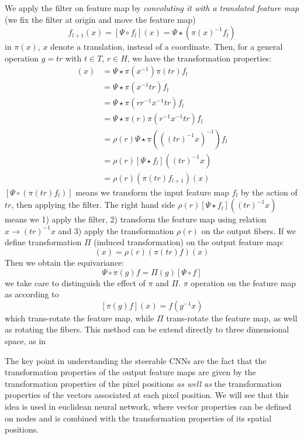 \documentclass{IEEEtran}
\begin{document}
We apply the filter on feature map by \emph{convoluting it with a translated 
feature map} (we fix the filter at origin and move the feature map)
\begin{equation}
    f_{l+1}(x) = [\Psi \circ f_l](x) = \Psi \star ( \pi(x)^{-1} f_l )
\end{equation}
in $\pi(x)$, $x$ denote a translation, instead of a coordinate. 
Then, for a general operation $g = tr$ with $t\in T$, $r \in H$, we have the transformation 
properties:
\begin{align*}
    [\Psi \circ (\pi(tr)f_l)](x) 
        &= \Psi \star \pi(x^{-1})\pi(tr) f_l \\
        &= \Psi \star \pi(x^{-1}tr) f_l \\
        &= \Psi \star \pi(rr^{-1}x^{-1}tr) f_l \\
        &= \Psi \star \pi(r) \pi(r^{-1}x^{-1}tr) f_l \\
        &= \rho(r) \Psi \star \pi\left(\left((tr)^{-1}x\right)^{-1}\right) f_l \\
        &= \rho(r) [ \Psi \star  f_l ]  ((tr)^{-1}x)\\
        &= \rho(r) (\pi(tr) f_{l+1}) (x) 
\end{align*}
$[\Psi \circ (\pi(tr)f_l)]$ means we transform the input feature map $f_l$ by the action of $tr$, then applying the filter. 
The right hand side $\rho(r) [ \Psi \star  f_l ]  ((tr)^{-1}x)$ means we 
1) apply the filter, 
2) transform the feature map using relation $x\to(tr)^{-1}x$ and 
3) apply the transformation $\rho(r)$ on the output fibers.
If we define transformation $\Pi$ (induced transformation) on the output feature map:
\begin{equation}
    [\Pi(tr) f ](x)= \rho(r) (\pi(tr) f) (x) \label{induced_transformation}
\end{equation}
Then we obtain the equivariance:
\begin{equation}
    \tag{Equivariance}
    \Psi \circ \pi(g) f = \Pi(g) [\Psi \circ f]
\end{equation}
we take care to distinguish the effect of $\pi$ and $\Pi$. $\pi$ operation on the feature map as according to 
\[[\pi(g) f](x) = f(g^{-1}x)\]
which trans-rotate the feature map, 
while $\Pi$ trans-rotate the feature map, as well as rotating the fibers.
This method can be extend directly to three dimensional space, as in \cite{weiler_3d_2018}

The key point in understanding the steerable CNNs are the fact that the transformation properties of the 
output feature maps are given by the transformation properties of the pixel positions \emph{as well as}
the transformation properties of the vectors associated at each pixel position. We will see that 
this idea is used in euclidean neural network, where vector properties can be defined on nodes and 
is combined with the transformation properties of its spatial positions.
\end{document}
